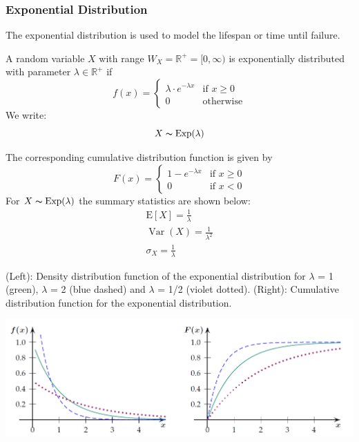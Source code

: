 \documentclass[11pt]{article}
\newcommand*\ev[1]{\mathrel{\text{E}\left[#1\right]}}
\newcommand*\R{\mathbb{R}}
\newcommand*\Var[1]{\mathop{\text{Var}}\left(#1\right)}
\begin{document}
\subsubsection{Exponential Distribution}
The exponential distribution is used to model the lifespan or time until failure.
\begin{definition}
	A random variable $X$ with range $W_X = \R^+ = [0,\infty)$ is exponentially distributed with parameter $\lambda \in \R^+$ if
	\begin{equation*}
		f(x) = \left\{
			\begin{matrix}
			\lambda\cdot e^{-\lambda x} & \text{if } x\geq 0\\
			0 & \text{otherwise}
			\end{matrix}
		\right.
	\end{equation*}
	We write: 
	\begin{equation*}
		X \thicksim \text{Exp}(\lambda)
	\end{equation*}
		
\end{definition}
The corresponding cumulative distribution function is given by
\begin{equation*}
		F(x) = \left\{
		\begin{matrix}
			1 - e^{-\lambda x} & \text{if } x\geq 0\\
			0 & \text{if } x < 0
		\end{matrix}
	\right.
\end{equation*}
For $X \thicksim \text{Exp}(\lambda)$ the summary statistics are shown below:
\begin{gather*}
	\ev{X} = \frac{1}{\lambda}\\
	\Var{X} = \frac{1}{\lambda^2}\\
	\sigma_X = \frac{1}{\lambda}
\end{gather*}

(Left): Density distribution function of the exponential distribution for $\lambda$ = 1 (green),
$\lambda$ = 2 (blue dashed) and $\lambda$ = 1/2 (violet dotted). (Right): Cumulative distribution
function for the exponential distribution.
\begin{center}
	\includegraphics[width=0.9\linewidth]{img/exp-distribution}
\end{center}
\end{document}
